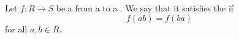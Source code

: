 \begin{definition} \label{definition:trace_property_for_a_function_on_a_ring}
    Let $f: R \to S$ be a  from a  to a . We say that it satisfies the  if 
    $$f(ab) =f(ba)$$
    for all $a,b \in R$.
\end{definition}